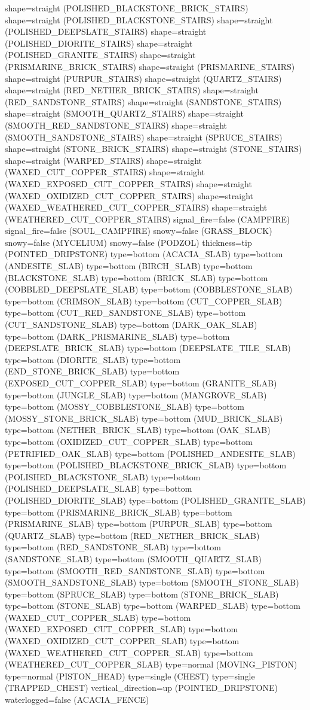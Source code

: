 \documentclass[11pt]{article}
\begin{document}
shape=straight (POLISHED_BLACKSTONE_BRICK_STAIRS)
shape=straight (POLISHED_BLACKSTONE_STAIRS)
shape=straight (POLISHED_DEEPSLATE_STAIRS)
shape=straight (POLISHED_DIORITE_STAIRS)
shape=straight (POLISHED_GRANITE_STAIRS)
shape=straight (PRISMARINE_BRICK_STAIRS)
shape=straight (PRISMARINE_STAIRS)
shape=straight (PURPUR_STAIRS)
shape=straight (QUARTZ_STAIRS)
shape=straight (RED_NETHER_BRICK_STAIRS)
shape=straight (RED_SANDSTONE_STAIRS)
shape=straight (SANDSTONE_STAIRS)
shape=straight (SMOOTH_QUARTZ_STAIRS)
shape=straight (SMOOTH_RED_SANDSTONE_STAIRS)
shape=straight (SMOOTH_SANDSTONE_STAIRS)
shape=straight (SPRUCE_STAIRS)
shape=straight (STONE_BRICK_STAIRS)
shape=straight (STONE_STAIRS)
shape=straight (WARPED_STAIRS)
shape=straight (WAXED_CUT_COPPER_STAIRS)
shape=straight (WAXED_EXPOSED_CUT_COPPER_STAIRS)
shape=straight (WAXED_OXIDIZED_CUT_COPPER_STAIRS)
shape=straight (WAXED_WEATHERED_CUT_COPPER_STAIRS)
shape=straight (WEATHERED_CUT_COPPER_STAIRS)
signal_fire=false (CAMPFIRE)
signal_fire=false (SOUL_CAMPFIRE)
snowy=false (GRASS_BLOCK)
snowy=false (MYCELIUM)
snowy=false (PODZOL)
thickness=tip (POINTED_DRIPSTONE)
type=bottom (ACACIA_SLAB)
type=bottom (ANDESITE_SLAB)
type=bottom (BIRCH_SLAB)
type=bottom (BLACKSTONE_SLAB)
type=bottom (BRICK_SLAB)
type=bottom (COBBLED_DEEPSLATE_SLAB)
type=bottom (COBBLESTONE_SLAB)
type=bottom (CRIMSON_SLAB)
type=bottom (CUT_COPPER_SLAB)
type=bottom (CUT_RED_SANDSTONE_SLAB)
type=bottom (CUT_SANDSTONE_SLAB)
type=bottom (DARK_OAK_SLAB)
type=bottom (DARK_PRISMARINE_SLAB)
type=bottom (DEEPSLATE_BRICK_SLAB)
type=bottom (DEEPSLATE_TILE_SLAB)
type=bottom (DIORITE_SLAB)
type=bottom (END_STONE_BRICK_SLAB)
type=bottom (EXPOSED_CUT_COPPER_SLAB)
type=bottom (GRANITE_SLAB)
type=bottom (JUNGLE_SLAB)
type=bottom (MANGROVE_SLAB)
type=bottom (MOSSY_COBBLESTONE_SLAB)
type=bottom (MOSSY_STONE_BRICK_SLAB)
type=bottom (MUD_BRICK_SLAB)
type=bottom (NETHER_BRICK_SLAB)
type=bottom (OAK_SLAB)
type=bottom (OXIDIZED_CUT_COPPER_SLAB)
type=bottom (PETRIFIED_OAK_SLAB)
type=bottom (POLISHED_ANDESITE_SLAB)
type=bottom (POLISHED_BLACKSTONE_BRICK_SLAB)
type=bottom (POLISHED_BLACKSTONE_SLAB)
type=bottom (POLISHED_DEEPSLATE_SLAB)
type=bottom (POLISHED_DIORITE_SLAB)
type=bottom (POLISHED_GRANITE_SLAB)
type=bottom (PRISMARINE_BRICK_SLAB)
type=bottom (PRISMARINE_SLAB)
type=bottom (PURPUR_SLAB)
type=bottom (QUARTZ_SLAB)
type=bottom (RED_NETHER_BRICK_SLAB)
type=bottom (RED_SANDSTONE_SLAB)
type=bottom (SANDSTONE_SLAB)
type=bottom (SMOOTH_QUARTZ_SLAB)
type=bottom (SMOOTH_RED_SANDSTONE_SLAB)
type=bottom (SMOOTH_SANDSTONE_SLAB)
type=bottom (SMOOTH_STONE_SLAB)
type=bottom (SPRUCE_SLAB)
type=bottom (STONE_BRICK_SLAB)
type=bottom (STONE_SLAB)
type=bottom (WARPED_SLAB)
type=bottom (WAXED_CUT_COPPER_SLAB)
type=bottom (WAXED_EXPOSED_CUT_COPPER_SLAB)
type=bottom (WAXED_OXIDIZED_CUT_COPPER_SLAB)
type=bottom (WAXED_WEATHERED_CUT_COPPER_SLAB)
type=bottom (WEATHERED_CUT_COPPER_SLAB)
type=normal (MOVING_PISTON)
type=normal (PISTON_HEAD)
type=single (CHEST)
type=single (TRAPPED_CHEST)
vertical_direction=up (POINTED_DRIPSTONE)
waterlogged=false (ACACIA_FENCE)
\end{document}
